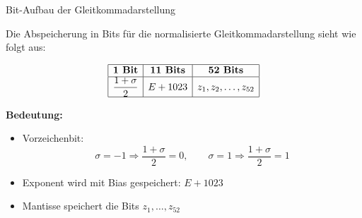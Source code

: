 \documentclass{beamer}
\begin{document}
\begin{frame}{Bit-Aufbau der Gleitkommadarstellung}

\small

Die Abspeicherung in Bits für die normalisierte Gleitkommadarstellung sieht wie folgt aus:

\vspace{0.7cm}

\[
\begin{array}{|c|c|c|}
\hline
\textbf{1 Bit} & \textbf{11 Bits} & \textbf{52 Bits} \\
\hline
\dfrac{1+\sigma}{2} & E+1023 & z_1,z_2,\dots,z_{52} \\
\hline
\end{array}
\]

\vspace{0.8cm}

\textbf{Bedeutung:}

\begin{itemize}
\item Vorzeichenbit:
\[
\sigma=-1 \Rightarrow \frac{1+\sigma}{2}=0,
\qquad
\sigma=1 \Rightarrow \frac{1+\sigma}{2}=1
\]

\item Exponent wird mit Bias gespeichert: \(E+1023\)

\item Mantisse speichert die Bits \(z_1,\dots,z_{52}\)
\end{itemize}

\end{frame}
\end{document}
